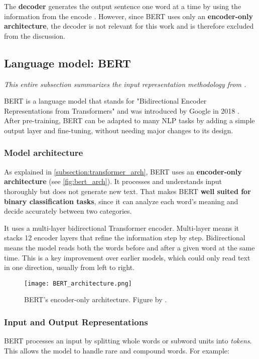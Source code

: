 The \textbf{decoder} generates the output sentence one word at a time by using the information from the encode \citep{xiaoIntroductionTransformersNLP2023}. However, since BERT uses only an \textbf{encoder-only architecture}, the decoder is not relevant for this work and is therefore excluded from the discussion.

\subsection{Language model: BERT}
\emph{This entire subsection summarizes the input representation methodology from \citet{devlinBERTPretrainingDeep2019}.}

\noindent BERT is a language model that stands for "Bidirectional Encoder Representations from Transformers" and was introduced by Google in 2018 \citep{devlinBERTPretrainingDeep2019}. After pre-training, BERT can be adapted to many NLP tasks by adding a simple output layer and fine-tuning, without needing major changes to its design.

\subsubsection{Model architecture}
As explained in \autoref{subsection:transformer_arch}, BERT uses an \textbf{encoder-only architecture} (see \autoref{fig:bert_arch}). It processes and understands input thoroughly but does not generate new text. That makes BERT \textbf{well suited for binary classification tasks}, since it can analyze each word’s meaning and decide accurately between two categories.

It uses a multi-layer bidirectional Transformer encoder. Multi-layer means it stacks 12 encoder layers that refine the information step by step. Bidirectional means the model reads both the words before and after a given word at the same time. This is a key improvement over earlier models, which could only read text in one direction, usually from left to right.


\begin{figure}
    \centering
	\texttt{[image: BERT\_architecture.png]}	
    \caption{BERT's encoder-only architecture. Figure by \citet{smithCompleteGuideBERT2024}.}
    \label{fig:bert_arch}
\end{figure}

\subsubsection{Input and Output Representations}
BERT processes an input by splitting whole words or subword units into \textit{tokens}. This allows the model to handle rare and compound words. For example:

